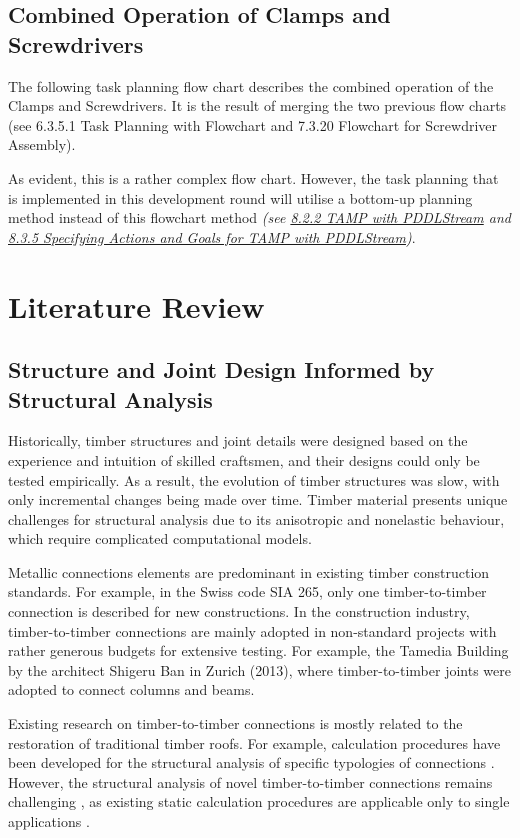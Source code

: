 \subsection{Combined Operation of Clamps and Screwdrivers}

The following task planning flow chart describes the combined operation of the Clamps and Screwdrivers. It is the result of merging the two previous flow charts (see 6.3.5.1 Task Planning with Flowchart and 7.3.20 Flowchart for Screwdriver Assembly).




As evident, this is a rather complex flow chart. However, the task planning that is implemented in this development round will utilise a bottom-up planning method instead of this flowchart method \textit{(see \ul{8.2.2 TAMP with PDDLStream} and \ul{8.3.5 Specifying Actions and Goals for TAMP with PDDLStream})}.

\section{Literature Review}

\subsection{Structure and Joint Design Informed by Structural Analysis}

Historically, timber structures and joint details were designed based on the experience and intuition of skilled craftsmen, and their designs could only be tested empirically. As a result, the evolution of timber structures was slow, with only incremental changes being made over time. Timber material presents unique challenges for structural analysis due to its anisotropic and nonelastic behaviour, which require complicated computational models. 

Metallic connections elements are predominant in existing timber construction standards. For example, in the Swiss code SIA 265, only one timber-to-timber connection is described for new constructions. In the construction industry, timber-to-timber connections are mainly adopted in non-standard projects with rather generous budgets for extensive testing. For example, the Tamedia Building by the architect Shigeru Ban in Zurich (2013), where timber-to-timber joints were adopted to connect columns and beams. \parencite{tanadiniAnalysisDesignTimbertotimber2021}

Existing research on timber-to-timber connections is mostly related to the restoration of traditional timber roofs. For example, calculation procedures have been developed for the structural analysis of specific typologies of connections \parencite{holzerstefanm.StaticAssessmentHistorical2015}. However, the structural analysis of novel timber-to-timber connections remains challenging \parencite{tanadiniAnalysisDesignTimbertotimber2021}, as existing static calculation procedures are applicable only to single applications \parencite{fangJoineryConnectionsTimber2018, nguyenDevelopmentSpringModel2018, rezaeiradMacroscopicModelSpatial2020}. 

